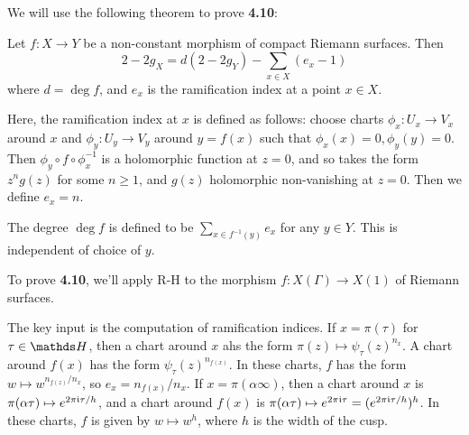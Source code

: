 \documentclass[10pt,a4paper]{article}
\begin{document}
We will use the following theorem to prove \textbf{4.10}:
\begin{theorem}
  Let $f: X \to Y$ be a non-constant morphism of compact Riemann surfaces. Then
  \[2-2g_X = d(2-2g_Y) - \sum_{x \in X}(e_x-1)\]
  where $d = \deg f$, and $e_x$ is the ramification index at a point $x \in X$.
\end{theorem}
Here, the ramification index at $x$ is defined as follows: choose charts $\phi_x: U_x \to V_x$ around $x$ and $\phi_y : U_y \to V_y$ around $y =f(x)$ such that $\phi_x(x) = 0, \phi_y(y) = 0$. Then $\phi_y \circ f \circ \phi_x^{-1}$ is a holomorphic function at $z=  0$, and so takes the form $z^n g(z)$ for some $n \geq 1$, and $g(z)$ holomorphic non-vanishing at $z= 0$. Then we define $e_x = n$.

The degree $\deg f$ is defined to be $\sum_{x \in f^{-1}(y)}e_x$ for any $y \in Y$. This is independent of choice of $y$.

To prove \textbf{4.10}, we'll apply R-H to the morphism $f: X(\Gamma) \to X(1)$ of Riemann surfaces.

The key input is the computation of ramification indices. If $x = \pi(\tau)$ for $\tau \in \H$, then a chart around $x$ ahs the form $\pi(z) \mapsto \psi_\tau(z)^{n_x}$. A chart around $f(x)$ has the form $\psi_\tau(z)^{n_{f(x)}}$. In these charts, $f$ has the form $w \mapsto w^{n_{f(z)}/n_x}$, so $e_x = n_{f(x)}/n_x$. If $x = \pi(\alpha \infty)$, then a chart around $x$ is $\pi(\alpha \tau) \mapsto e^{2\pi \mathfrak{i} \tau/h}$, and a chart around $f(x)$ is $\pi(\alpha \tau) \mapsto e^{2\pi\mathfrak{i} \tau} = (e^{2\pi\mathfrak{i}\tau/h})^h$. In these charts, $f$ is given by $w \mapsto w^h$, where $h$ is the width of the cusp.
\end{document}
